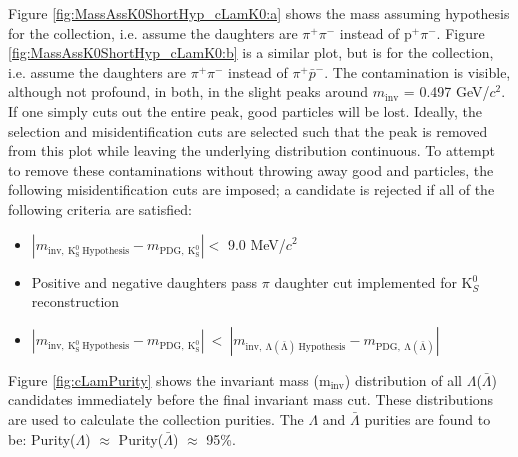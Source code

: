 \documentclass[../AnalysisNoteJBuxton.tex]{subfiles}
\begin{document}
Figure \ref{fig:MassAssK0ShortHyp_cLamK0:a} shows the mass assuming \Ks hypothesis for the \Lam collection, i.e. assume the daughters are $\pi^{+}\pi^{-}$ instead of p$^{+}\pi^{-}$.
Figure \ref{fig:MassAssK0ShortHyp_cLamK0:b} is a similar plot, but is for the \ALam collection, i.e. assume the daughters are $\pi^{+}\pi^{-}$ instead of $\pi^{+}\bar{p}^{-}$.
The \Ks contamination is visible, although not profound, in both, in the slight peaks around $m_{\mathrm{inv}}$ = 0.497 GeV/$c^{2}$.
If one simply cuts out the entire peak, good \Lam particles will be lost.
Ideally, the \Lam selection and \Ks misidentification cuts are selected such that the peak is removed from this plot while leaving the underlying distribution continuous.
To attempt to remove these \Ks contaminations without throwing away good \Lam and \ALam particles, the following misidentification cuts are imposed; a \LamALam candidate is rejected if all of the following criteria are satisfied:
\begin{itemize}
 \item $\left|m_{\mathrm{inv,~ K^{0}_{S}~ Hypothesis}} - m_{\mathrm{PDG,~ K^{0}_{S}}}\right| < $ 9.0 MeV/$c^{2}$
 \item Positive and negative daughters pass $\pi$ daughter cut implemented for K$^{0}_{S}$ reconstruction
 \item $\left|m_{\mathrm{inv,~ K^{0}_{S}~ Hypothesis}} - m_{\mathrm{PDG,~ K^{0}_{S}}}\right|~ < ~\left|m_{\mathrm{inv,~ \Lambda(\bar{\Lambda})~ Hypothesis}} - m_{\mathrm{PDG,~ \Lambda(\bar{\Lambda})}}\right|$
\end{itemize} 


Figure \ref{fig:cLamPurity} shows the invariant mass (m$_{\mathrm{inv}}$) distribution of all $\Lambda$($\bar{\Lambda}$) candidates immediately before the final invariant mass cut.
These distributions are used to calculate the collection purities.
The $\Lambda$ and $\bar{\Lambda}$ purities are found to be: Purity($\Lambda$) $\approx$ Purity($\bar{\Lambda}$) $\approx$ 95\%.
\end{document}
